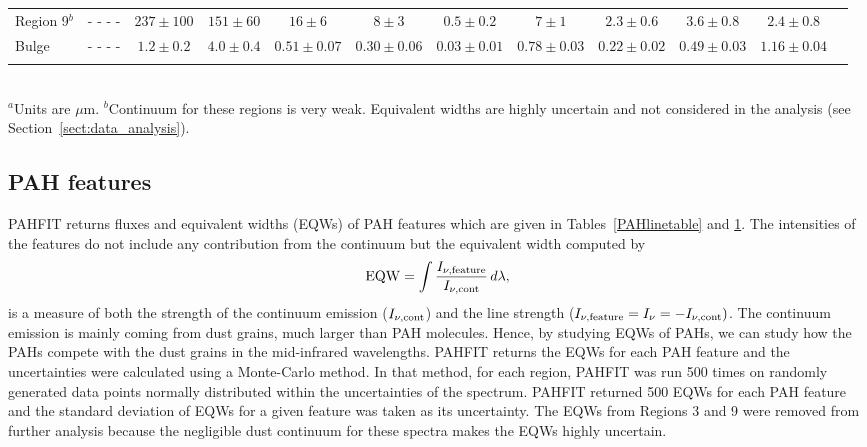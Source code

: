 \begin{table}
\begin{minipage}{200mm}
\begin{tabular}{l c c  c  c  c  c  c  c  c  c c }
 Region 9$^b$ & - - - -                 & $237\pm100$          & $151\pm60$        & $16\pm6$                 & $8\pm3$                   & $0.5\pm0.2$             & $7\pm1$                   & $2.3\pm0.6$             & $3.6\pm0.8$                 & $2.4\pm0.8$  \\
 Bulge       & - - - -                          & $1.2\pm0.2$            & $4.0\pm0.4$        & $0.51\pm0.07$         & $0.30\pm0.06$        & $0.03\pm0.01$        & $0.78\pm0.03$        & $0.22\pm0.02$        & $0.49\pm0.03$            & $1.16\pm0.04$ \\             
\hline
 \label{EQW}
\end{tabular}\\
{$^a$Units are $\mu$m. 
$^b$Continuum for these regions is very weak.  Equivalent widths are highly uncertain and not considered in the analysis (see Section~\ref{sect:data_analysis}).}
\end{minipage}
\end{table}



\subsection{PAH features}
\label{sect:pah}

PAHFIT returns fluxes and equivalent widths (EQWs) of PAH features which are given in Tables~\ref{PAHlinetable} and \ref{EQW}. 
The intensities of the features do not include any contribution from the continuum but the equivalent width computed by
\begin{equation}
{\rm EQW}=\int \frac{I_{\nu,{\rm feature}}}{I_{\nu, {\rm cont}}} \,d\lambda,
\end{equation}
is a measure of both the strength of the continuum emission ($I_{\nu, {\rm cont}} $) and the line strength 
($I_{\nu,{\rm feature}}=I_{\nu} =- I_{\nu, {\rm cont}})$. 
The continuum emission is mainly coming from dust grains, much larger than PAH molecules. Hence, by studying EQWs of PAHs, 
we can study how the PAHs compete with the dust grains in the mid-infrared wavelengths.  PAHFIT returns the EQWs for each PAH 
feature and the uncertainties were calculated using a Monte-Carlo method. In that method, for each region, PAHFIT was run 500 times on 
randomly generated data points  normally distributed within the uncertainties of the spectrum. PAHFIT returned 500 EQWs for each 
PAH feature and the standard deviation of EQWs for a given feature was taken as its uncertainty. 
The EQWs from Regions 3 and 9 were removed from further analysis because the negligible dust continuum for these spectra makes
the EQWs highly uncertain.


